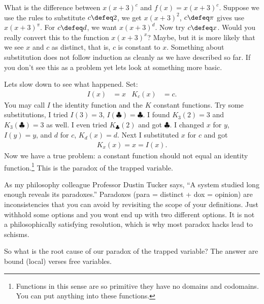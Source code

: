 What is the difference between $x(x+3)^c$ and $f(x)=x(x+3)^c$.  Suppose we use 
the rules to substitute $c\defeq 2$, we get $x(x+3)^2$, $c\defeq \pi$ gives 
use $x(x+3)^{\pi}$.  For $c\defeq d$, we want $x(x+3)^d$.  
Now try $c\defeq x$.  Would you really 
convert this to the function $x(x+3)^x$?  Maybe, but it is more likely that 
we see $x$ and $c$ as distinct, that is, $c$ is constant to $x$.
Something about substitution does not follow induction as cleanly as we have described so far.
If you don't see this as a problem yet lets look at something more basic.

Lets slow down to see what happened.  Set:
\begin{align*}
    I(x) & = x & 
    K_c(x) & = c.
\end{align*}
You may call $I$ the identity function and the $K$ constant functions.
Try some substitutions, I tried $I(3)=3$, $I(\clubsuit)=\clubsuit$.
I found $K_3(2)=3$ and $K_3(\clubsuit)=3$ as well.  I even tried 
$K_{\clubsuit}(2)$ and got $\clubsuit$.  I changed $x$ for $y$, 
$I(y)=y$, and $d$ for $c$, $K_d(x)=d$. Next I substituted $x$ for $c$ and got
\begin{align*}
    K_x(x)=x=I(x).
\end{align*}
Now we have a true problem: a constant function should not equal 
an identity function.\footnote{Functions in this sense are so primitive 
they have no domains and codomains.  You can put anything into these functions.}
This is the paradox of the trapped variable.

As my philosophy  colleague Professor Dustin Tucker says, 
``A system studied long enough reveals its paradoxes.'' 
Paradoxes (para = distinct + dox = opinion) are inconsistencies that you can avoid by revisiting the scope 
of your definitions.  Just withhold some options and you wont end up with 
two different options.  It is not a philosophically satisfying resolution,
which is why most paradox hacks lead to schisms. 

So what is the root cause of our paradox of the trapped variable?
The answer are bound (local) verses free variables. 
